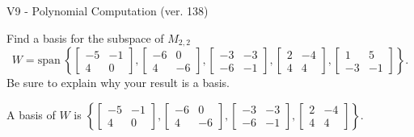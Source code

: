 \begin{exercise}
  \begin{exerciseTitle}V9 - Polynomial Computation (ver. 138)\end{exerciseTitle}
  \begin{exerciseStatement}
    Find a basis for the subspace of \(M_{2,2}\) 
\[W=\mathrm{span}\ \left\{\left[\begin{array}{cc}
-5 & -1 \\
4 & 0
\end{array}\right] , \left[\begin{array}{cc}
-6 & 0 \\
4 & -6
\end{array}\right] , \left[\begin{array}{cc}
-3 & -3 \\
-6 & -1
\end{array}\right] , \left[\begin{array}{cc}
2 & -4 \\
4 & 4
\end{array}\right] , \left[\begin{array}{cc}
1 & 5 \\
-3 & -1
\end{array}\right]\right\}.\]
 Be sure to explain why your result is a basis.


  \end{exerciseStatement}
  \begin{exerciseAnswer}
   A basis of \(W\) is  \(\left\{\left[\begin{array}{cc}
-5 & -1 \\
4 & 0
\end{array}\right] , \left[\begin{array}{cc}
-6 & 0 \\
4 & -6
\end{array}\right] , \left[\begin{array}{cc}
-3 & -3 \\
-6 & -1
\end{array}\right] , \left[\begin{array}{cc}
2 & -4 \\
4 & 4
\end{array}\right]\right\}\).
  


  \end{exerciseAnswer}
\end{exercise}